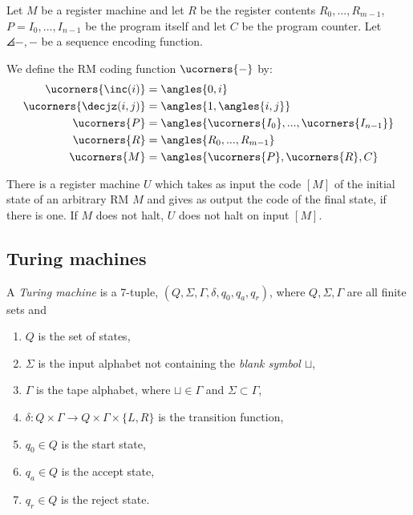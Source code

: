 \documentclass{article}
\begin{document}
\begin{definition*}[RM encoding]
	Let $M$ be a register machine and let $R$ be the register contents $R_0,...,R_{m-1}$,
	$P=I_0,...,I_{n-1}$ be the program itself and let $C$ be the program counter.
	Let $\angles{-,-}$ be a sequence encoding function.

	We define the RM coding function $\ucorners{-}$ by:
	\begin{align*}
		\ucorners{\inc(i)}     & = \angles{0,i}                   \\
		\ucorners{\decjz(i,j)} & = \angles{1,\angles{i,j}}        \\
		\ucorners{P}           & = \angles{\ucorners{I_0}, ..., \ucorners{I_{n-1}}} \\
		\ucorners{R}           & = \angles{R_0, ..., R_{m-1}}     \\
		\ucorners{M}           & = \angles{\ucorners{P}, \ucorners{R}, C}
	\end{align*}
\end{definition*}

\begin{theorem*}
	There is a register machine $U$ which takes as input the code $\left[M\right]$ of the
	initial state of an arbitrary RM $M$ and gives as output the code of the final
	state, if there is one. If $M$ does not halt, $U$ does not halt on input
	$\left[M\right]$.
\end{theorem*}

\subsection{Turing machines}

\begin{definition*}[TM; Sipser]
	A \emph{Turing machine} is a 7-tuple, $(Q, \Sigma, \Gamma, \delta, q_0, q_a, q_r)$,
	where $Q,\Sigma,\Gamma$ are all finite sets and
	\begin{enumerate}
		\item $Q$ is the set of states,
		\item $\Sigma$ is the input alphabet not containing the \emph{blank symbol $\sqcup$},
		\item $\Gamma$ is the tape alphabet, where $\sqcup\in\Gamma$ and $\Sigma\subset\Gamma$,
		\item $\delta:Q\times\Gamma\to Q\times\Gamma\times\{L,R\}$ is the transition function,
		\item $q_0\in Q$ is the start state,
		\item $q_a\in Q$ is the accept state,
		\item $q_r\in Q$ is the reject state.
	\end{enumerate}
\end{definition*}
\end{document}
